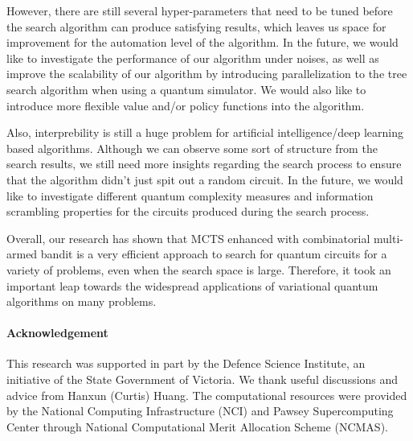 \documentclass{ieeeaccess}
\begin{document}
However, there are still several hyper-parameters that need to be tuned before the search algorithm can produce satisfying results, which leaves us space for improvement for the automation level of the algorithm. In the future, we would like to investigate the performance of our algorithm under noises, as well as improve the scalability of our algorithm by introducing parallelization to the tree search algorithm when using a quantum simulator. We would also like to introduce more flexible value and/or policy functions into the algorithm.

Also, interprebility is still a huge problem for artificial intelligence/deep learning based algorithms. Although we can observe some sort of structure from the search results, we still need more insights regarding the search process to ensure that the algorithm didn't just spit out a random circuit. In the future, we would like to investigate different quantum complexity measures and information scrambling properties for the circuits produced during the search process.

Overall, our research has shown that MCTS enhanced with combinatorial multi-armed bandit is a very efficient approach to search for quantum circuits for a variety of problems, even when the search space is large. Therefore, it took an important leap towards the widespread applications of variational quantum algorithms on many problems.

\paragraph{Acknowledgement} This research was supported in part by the Defence Science Institute, an initiative of the State Government of Victoria. We thank useful discussions and advice from Hanxun (Curtis) Huang. The computational resources were provided by the National Computing Infrastructure (NCI) and Pawsey Supercomputing Center through National Computational Merit Allocation Scheme (NCMAS).

















\newpage

\typeout{} 




\EOD
\end{document}
